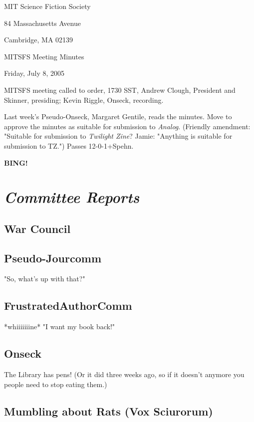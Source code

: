 \documentclass[10pt]{article}
\newcommand{\bing}{{\bf BING!} }
\newcommand{\goto}[1]{\bing \vskip 12pt \section*{{\em{#1}}}}
\begin{document}
\begin{center}

MIT Science Fiction Society

84 Massachusetts Avenue

Cambridge, MA 02139

\vspace{12pt}

MITSFS Meeting Minutes

Friday, July 8, 2005

\end{center}

\vspace{18pt}

\setlength{\parskip}{6pt}

\noindent
MITSFS meeting called to order, 1730 SST, Andrew Clough, President and
Skinner, presiding; Kevin Riggle,  Onseck, recording.

Last week's Pseudo-Onseck, Margaret Gentile, reads the minutes.  Move
to approve the minutes as suitable for submission to {\em Analog}.
(Friendly amendment: "Suitable for submission to {\em Twilight Zine}? 
Jamie: "Anything is suitable for submission to TZ.")
Passes 12-0-1+Spehn.

\goto{Committee Reports}
\subsection*{War Council}

\subsection*{Pseudo-Jourcomm}
"So, what's up with that?"

\subsection*{FrustratedAuthorComm}
*whiiiiiiine*  "I want my book back!"

\subsection*{Onseck}

The Library has pens!  (Or it did three weeks ago, so if it doesn't anymore you
people need to stop eating them.)

\subsection*{Mumbling about Rats (Vox Sciurorum)}
\end{document}
